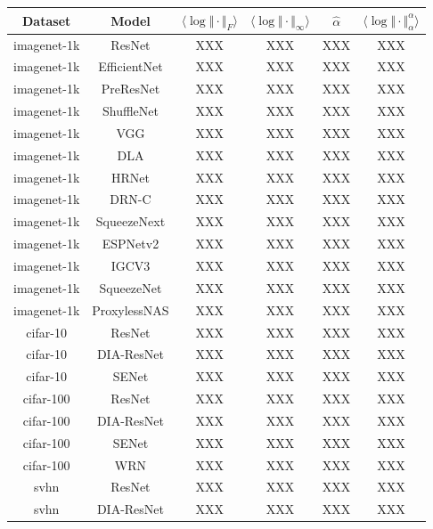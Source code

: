 \begin{table}[t]
\scriptsize
\begin{center}
\begin{tabular}{|c|c|c|c|c|c|}
\hline
Dataset & Model  & $\langle\log\Vert\cdot\Vert_{F}\rangle$ & $\langle\log\Vert\cdot\Vert_{\infty}\rangle$ & $\hat{\alpha}$ & $\langle\log\Vert\cdot\Vert^{\alpha}_{\alpha}\rangle$ \\
\hline
 imagenet-1k  & ResNet        &  XXX &   XXX &  XXX &  XXX \\
 imagenet-1k  & EfficientNet  &  XXX &   XXX &  XXX &  XXX \\
 imagenet-1k  & PreResNet     &  XXX &   XXX &  XXX &  XXX \\
 imagenet-1k  & ShuffleNet    &  XXX &   XXX &  XXX &  XXX \\
 imagenet-1k  & VGG           &  XXX &   XXX &  XXX &  XXX \\
 imagenet-1k  & DLA           &  XXX &   XXX &  XXX &  XXX \\
 imagenet-1k  & HRNet         &  XXX &   XXX &  XXX &  XXX \\
 imagenet-1k  & DRN-C         &  XXX &   XXX &  XXX &  XXX \\
 imagenet-1k  & SqueezeNext   &  XXX &   XXX &  XXX &  XXX \\
 imagenet-1k  & ESPNetv2      &  XXX &   XXX &  XXX &  XXX \\
 imagenet-1k  & IGCV3         &  XXX &   XXX &  XXX &  XXX \\
 imagenet-1k  & SqueezeNet    &  XXX &   XXX &  XXX &  XXX \\
 imagenet-1k  & ProxylessNAS  &  XXX &   XXX &  XXX &  XXX \\
\hline
 cifar-10     & ResNet        &  XXX &   XXX &  XXX &  XXX \\
 cifar-10     & DIA-ResNet    &  XXX &   XXX &  XXX &  XXX \\
 cifar-10     & SENet         &  XXX &   XXX &  XXX &  XXX \\
\hline
 cifar-100    & ResNet        &  XXX &   XXX &  XXX &  XXX \\
 cifar-100    & DIA-ResNet    &  XXX &   XXX &  XXX &  XXX \\
 cifar-100    & SENet         &  XXX &   XXX &  XXX &  XXX \\
 cifar-100    & WRN           &  XXX &   XXX &  XXX &  XXX \\
\hline
 svhn         & ResNet        &  XXX &   XXX &  XXX &  XXX \\
 svhn         & DIA-ResNet    &  XXX &   XXX &  XXX &  XXX \\

\end{tabular}
\end{center}
\end{table}
